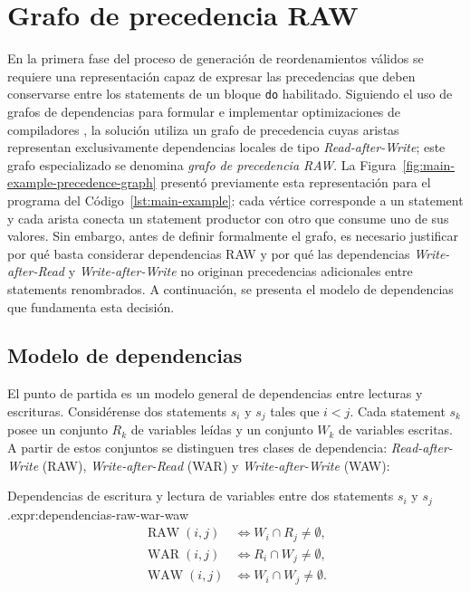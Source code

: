 
\section{Grafo de precedencia RAW}
\label{sec:solucion-grafo-precedencia-raw}

En la primera fase del proceso de generación de reordenamientos válidos se requiere una representación capaz de expresar las precedencias que deben conservarse entre los statements de un bloque \texttt{do} habilitado. Siguiendo el uso de grafos de dependencias para formular e implementar optimizaciones de compiladores \cite{KuckEtAl1981}, la solución utiliza un grafo de precedencia cuyas aristas representan exclusivamente dependencias locales de tipo \textit{Read-after-Write}; este grafo especializado se denomina \textit{grafo de precedencia RAW}. La Figura~\ref{fig:main-example-precedence-graph} presentó previamente esta representación para el programa del Código~\ref{lst:main-example}: cada vértice corresponde a un statement y cada arista conecta un statement productor con otro que consume uno de sus valores. Sin embargo, antes de definir formalmente el grafo, es necesario justificar por qué basta considerar dependencias RAW y por qué las dependencias \textit{Write-after-Read} y \textit{Write-after-Write} no originan precedencias adicionales entre statements renombrados. A continuación, se presenta el modelo de dependencias que fundamenta esta decisión.

\subsection{Modelo de dependencias}
\label{sec:solucion-modelo-dependencias}

El punto de partida es un modelo general de dependencias entre lecturas y escrituras. Considérense dos statements $s_i$ y $s_j$ tales que $i<j$. Cada statement $s_k$ posee un conjunto $R_k$ de variables leídas y un conjunto $W_k$ de variables escritas. A partir de estos conjuntos se distinguen tres clases de dependencia: \textit{Read-after-Write} (RAW), \textit{Write-after-Read} (WAR) y \textit{Write-after-Write} (WAW):

\begin{ReportExpression}{Dependencias de escritura y lectura de variables entre dos statements $s_i$ y $s_j$.}{expr:dependencias-raw-war-waw}
\[
\begin{aligned}
\operatorname{RAW}(i,j) &\iff W_i\cap R_j\neq\emptyset,\\
\operatorname{WAR}(i,j) &\iff R_i\cap W_j\neq\emptyset,\\
\operatorname{WAW}(i,j) &\iff W_i\cap W_j\neq\emptyset.
\end{aligned}
\]
\end{ReportExpression}

